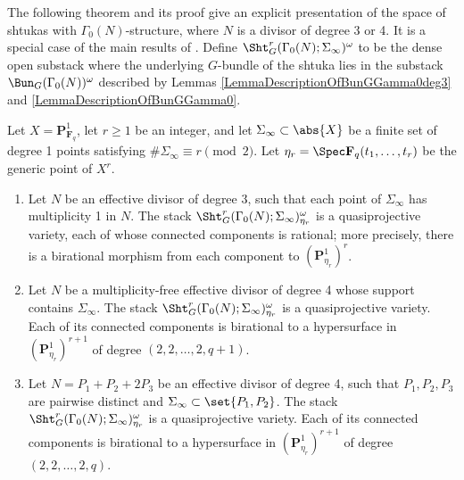 \documentclass{article}
\def\F{\mathbf{F}}
\def\P{\mathbf{P}}
\begin{document}
The following theorem and its proof give an explicit presentation of the space of shtukas with $\Gamma_0(N)$-structure, where $N$ is a divisor of degree 3 or 4.  
It is a special case of the main results of \cite{Fernandez}.  Define $\Sht^r_G(\Gamma_0(N);\Sigma_\infty)^{\omega}$ to be the dense open substack where the underlying $G$-bundle of the shtuka lies in the substack $\Bun_G(\Gamma_0(N))^{\omega}$ described by Lemmas \ref{LemmaDescriptionOfBunGGamma0deg3} and \ref{LemmaDescriptionOfBunGGamma0}.  

\begin{thm} \label{ThmPresentationOfShtukas} Let $X=\mathbf{P}^1_{\F_q}$,  let $r\geq 1$ be an integer, and let $\Sigma_\infty\subset \abs{X}$ be a finite set of degree 1 points satisfying $\#\Sigma_\infty\equiv r\pmod{2}$.   Let $\eta_r= \Spec \F_q(t_1,\dots,t_r)$ be the generic point of $X^r$.  
\begin{enumerate}
\item Let $N$ be an effective divisor of degree 3, such that each point of $\Sigma_\infty$ has multiplicity 1 in $N$.    The stack $\Sht^r_G(\Gamma_0(N);\Sigma_\infty)^{\omega}_{\eta_r}$ is a quasiprojective variety, each of whose connected components is rational; more precisely, there is a birational morphism from each component to $(\P^1_{\eta_r})^r$.  
\item Let $N$ be a multiplicity-free effective divisor of degree 4 whose support contains $\Sigma_\infty$.  The stack $\Sht^r_G(\Gamma_0(N);\Sigma_\infty)^{\omega}_{\eta_r}$ is a quasiprojective variety.  Each of its connected components is birational to a hypersurface in $(\P^1_{\eta_r})^{r+1}$ of degree $(2,2,\dots,2,q+1)$.  
\item Let $N=P_1+P_2+2P_3$ be an effective divisor of degree 4, such that $P_1,P_2,P_3$ are pairwise distinct and $\Sigma_\infty\subset \set{P_1,P_2}$. The stack $\Sht^r_G(\Gamma_0(N);\Sigma_\infty)^{\omega}_{\eta_r}$ is a quasiprojective variety.  Each of its connected components is birational to a hypersurface in $(\P^1_{\eta_r})^{r+1}$ of degree $(2,2,\dots,2,q)$.  
\end{enumerate}
\end{thm}
\end{document}
